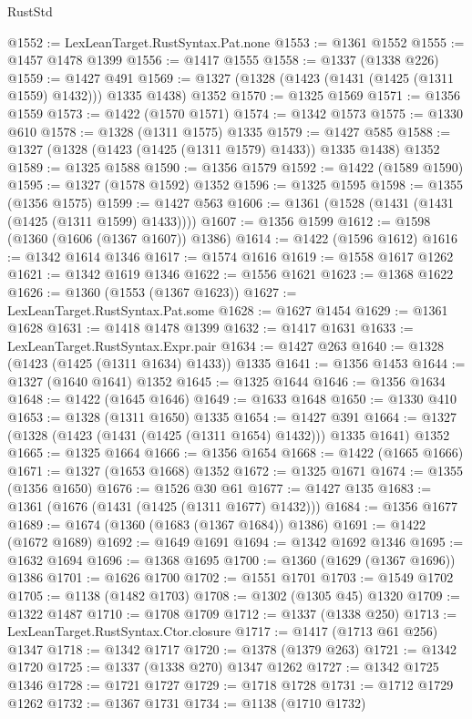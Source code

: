 \begin{lexlean}{RustStd}
\begin{coremodule}
@1552 := LexLeanTarget.RustSyntax.Pat.none
@1553 := @1361 @1552
@1555 := @1457 @1478 @1399
@1556 := @1417 @1555
@1558 := @1337 (@1338 @226)
@1559 := @1427 @491
@1569 := @1327 (@1328 (@1423 (@1431 (@1425 (@1311 @1559) @1432))) @1335 @1438) @1352
@1570 := @1325 @1569
@1571 := @1356 @1559
@1573 := @1422 (@1570 @1571)
@1574 := @1342 @1573
@1575 := @1330 @610
@1578 := @1328 (@1311 @1575) @1335
@1579 := @1427 @585
@1588 := @1327 (@1328 (@1423 (@1425 (@1311 @1579) @1433)) @1335 @1438) @1352
@1589 := @1325 @1588
@1590 := @1356 @1579
@1592 := @1422 (@1589 @1590)
@1595 := @1327 (@1578 @1592) @1352
@1596 := @1325 @1595
@1598 := @1355 (@1356 @1575)
@1599 := @1427 @563
@1606 := @1361 (@1528 (@1431 (@1431 (@1425 (@1311 @1599) @1433))))
@1607 := @1356 @1599
@1612 := @1598 (@1360 (@1606 (@1367 @1607)) @1386)
@1614 := @1422 (@1596 @1612)
@1616 := @1342 @1614 @1346
@1617 := @1574 @1616
@1619 := @1558 @1617 @1262
@1621 := @1342 @1619 @1346
@1622 := @1556 @1621
@1623 := @1368 @1622
@1626 := @1360 (@1553 (@1367 @1623))
@1627 := LexLeanTarget.RustSyntax.Pat.some
@1628 := @1627 @1454
@1629 := @1361 @1628
@1631 := @1418 @1478 @1399
@1632 := @1417 @1631
@1633 := LexLeanTarget.RustSyntax.Expr.pair
@1634 := @1427 @263
@1640 := @1328 (@1423 (@1425 (@1311 @1634) @1433)) @1335
@1641 := @1356 @1453
@1644 := @1327 (@1640 @1641) @1352
@1645 := @1325 @1644
@1646 := @1356 @1634
@1648 := @1422 (@1645 @1646)
@1649 := @1633 @1648
@1650 := @1330 @410
@1653 := @1328 (@1311 @1650) @1335
@1654 := @1427 @391
@1664 := @1327 (@1328 (@1423 (@1431 (@1425 (@1311 @1654) @1432))) @1335 @1641) @1352
@1665 := @1325 @1664
@1666 := @1356 @1654
@1668 := @1422 (@1665 @1666)
@1671 := @1327 (@1653 @1668) @1352
@1672 := @1325 @1671
@1674 := @1355 (@1356 @1650)
@1676 := @1526 @30 @61
@1677 := @1427 @135
@1683 := @1361 (@1676 (@1431 (@1425 (@1311 @1677) @1432)))
@1684 := @1356 @1677
@1689 := @1674 (@1360 (@1683 (@1367 @1684)) @1386)
@1691 := @1422 (@1672 @1689)
@1692 := @1649 @1691
@1694 := @1342 @1692 @1346
@1695 := @1632 @1694
@1696 := @1368 @1695
@1700 := @1360 (@1629 (@1367 @1696)) @1386
@1701 := @1626 @1700
@1702 := @1551 @1701
@1703 := @1549 @1702
@1705 := @1138 (@1482 @1703)
@1708 := @1302 (@1305 @45) @1320
@1709 := @1322 @1487
@1710 := @1708 @1709
@1712 := @1337 (@1338 @250)
@1713 := LexLeanTarget.RustSyntax.Ctor.closure
@1717 := @1417 (@1713 @61 @256) @1347
@1718 := @1342 @1717
@1720 := @1378 (@1379 @263)
@1721 := @1342 @1720
@1725 := @1337 (@1338 @270) @1347 @1262
@1727 := @1342 @1725 @1346
@1728 := @1721 @1727
@1729 := @1718 @1728
@1731 := @1712 @1729 @1262
@1732 := @1367 @1731
@1734 := @1138 (@1710 @1732)

\end{coremodule}
\end{lexlean}
